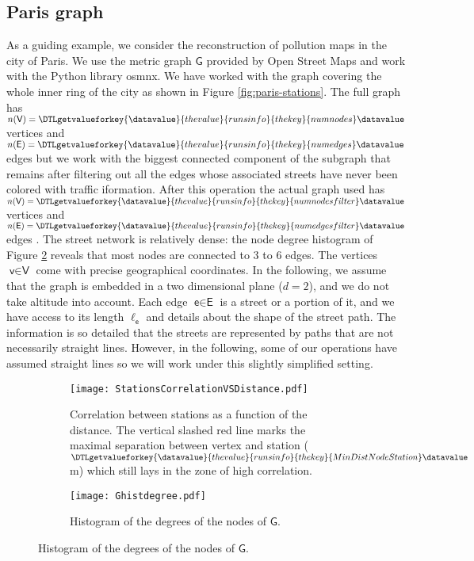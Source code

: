 \documentclass[11pt,a4paper,twoside]{article}
\newcommand{\perplexityinsert}[1]{\DTLgetvalueforkey{\datavalue}{thevalue}{runsinfo}{thekey}{#1}\datavalue}
\newcommand{\asmodif}[2]{{\color{teal} #1} {\sout{#2}}}
\theoremstyle{definition}
\numberwithin{equation}{section}
\newcommand{\G}{\ensuremath{\textsf{G}}} %
\newcommand{\E}{\ensuremath{\textsf{E}}} %
\newcommand{\V}{\ensuremath{\textsf{V}}} %
\newcommand{\vv}{\ensuremath{\textsf{v}}}
\newcommand{\ee}{\ensuremath{\textsf{e}}}
\newcommand{\<}{\langle}
\renewcommand{\>}{\rangle}
\begin{document}
\subsection{Paris graph}
\label{sec:paris-graph}

As a guiding example, we consider the reconstruction of pollution maps in the city of Paris. \asmodif{We use the metric graph $\G$ provided by Open Street Maps and work with the Python library osmnx. We have worked with the graph covering the whole inner ring of the city as shown in Figure \ref{fig:paris-stations}. The full graph has $n(\V)=\perplexityinsert{numnodes}$ vertices and $n(\E)=\perplexityinsert{numedges}$ edges but we work with the biggest connected component of the subgraph that remains after filtering out all the edges whose associated streets have never been colored with traffic iformation. After this operation the actual graph used has $n(\V)=\perplexityinsert{numnodesfilter}$ vertices and $n(\E)=\perplexityinsert{numedgesfilter}$ edges}{}. The street network is relatively dense: the node degree histogram of Figure \ref{fig:degree-histogram} reveals that most nodes are connected to 3 to 6 edges. The vertices $\vv \in \V$ come with precise geographical coordinates. In the following, we assume that the graph is embedded in a two dimensional plane ($d=2$), and we do not take altitude into account. Each edge $\ee\in \E$ is a street or a portion of it, and we have access to its length $\ell_\ee$ and details about the shape of the street path. The information is so detailed that the streets are represented by paths that are not necessarily straight lines. However, in the following, some of our operations have assumed straight lines so we will work under this slightly simplified setting.

\begin{figure}
      \centering
      \begin{subfigure}[b]{0.48\textwidth}
          \centering
          \texttt{[image: StationsCorrelationVSDistance.pdf]}
          \caption{Correlation between stations as a function of the distance. The vertical slashed red line marks the maximal separation between vertex and station ($\perplexityinsert{MinDistNodeStation}$m) which still lays in the zone of high correlation.}
          \label{fig:correlation}
      \end{subfigure}
      \hfill
      \begin{subfigure}[b]{0.48\textwidth}
          \centering
			\texttt{[image: Ghistdegree.pdf]}
			\caption{Histogram of the degrees of the nodes of $\G$.}
          \label{fig:degree-histogram}
      \end{subfigure}
      \label{fig:stations-nodes}
 \end{figure}
\end{document}
